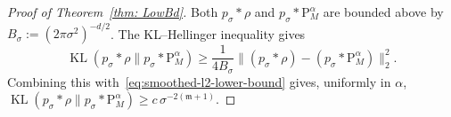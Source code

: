 \documentclass[10pt,a4paper]{amsart}
\begin{document}
\begin{proof}[Proof of Theorem~\ref{thm: LowBd}]
Both $p_\sigma*\rho$ and $p_\sigma*\mathrm P_M^\alpha$ are bounded above by
$B_\sigma:=(2\pi\sigma^2)^{-d/2}$. The KL--Hellinger inequality gives
\[
\operatorname{KL}(p_\sigma*\rho\|p_\sigma*\mathrm P_M^\alpha)
\geq\frac1{4B_\sigma}
\|(p_\sigma*\rho)-(p_\sigma*\mathrm P_M^\alpha)\|_2^2.
\]
Combining this with~\eqref{eq:smoothed-l2-lower-bound} gives, uniformly in
$\alpha$,
\(
\operatorname{KL}(p_\sigma*\rho\|p_\sigma*\mathrm P_M^\alpha)
\geq c\,\sigma^{-2(\mathfrak m+1)}.
\)
\end{proof}
\end{document}
